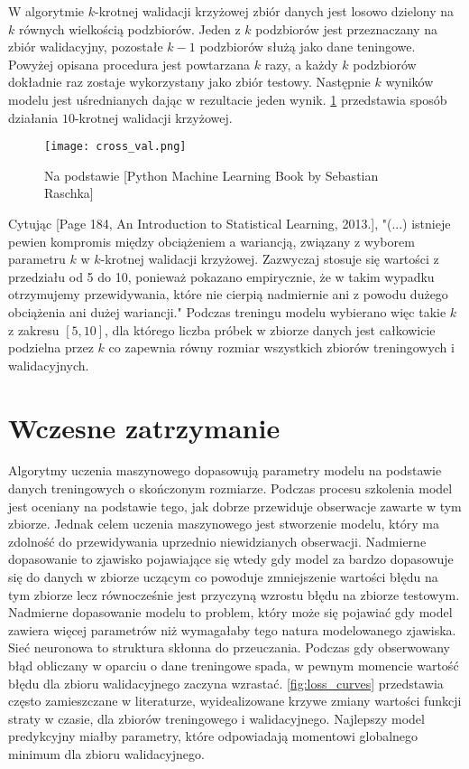 \documentclass[11pt]{book}
\theoremstyle{definition}
\begin{document}
W algorytmie $k$-krotnej walidacji krzyżowej zbiór danych jest losowo dzielony na $k$ równych wielkością podzbiorów. Jeden z $k$ podzbiorów jest przeznaczany na zbiór walidacyjny, pozostałe $k-1$ podzbiorów służą jako dane teningowe. Powyżej opisana procedura jest powtarzana $k$ razy, a każdy $k$ podzbiorów dokładnie raz zostaje wykorzystany jako zbiór testowy. Następnie $k$ wyników modelu jest uśrednianych dając w rezultacie jeden wynik. \figurename{} \ref{fig:cross-val} przedstawia sposób działania $10$-krotnej walidacji krzyżowej.

\begin{figure}[htp!]
	\centering
	\texttt{[image: cross\_val.png]}
	\caption{Na podstawie [Python Machine Learning
		Book by Sebastian Raschka]}
	\label{fig:cross-val}
\end{figure}

Cytując [Page 184, An Introduction to Statistical Learning, 2013.], "(...) istnieje pewien kompromis między obciążeniem a wariancją, związany z wyborem parametru $k$ w $k$-krotnej walidacji krzyżowej. Zazwyczaj stosuje się wartości z przedziału od 5 do 10, ponieważ pokazano empirycznie, że w takim wypadku otrzymujemy przewidywania, które nie cierpią nadmiernie ani z powodu dużego obciążenia ani dużej wariancji." Podczas treningu modelu wybierano więc takie $k$ z zakresu $[5,10]$, dla którego liczba próbek w zbiorze danych jest całkowicie podzielna przez $k$ co zapewnia równy rozmiar wszystkich zbiorów treningowych i walidacyjnych.

\section{Wczesne zatrzymanie}
Algorytmy uczenia maszynowego dopasowują parametry modelu na podstawie danych treningowych o skończonym rozmiarze. Podczas procesu szkolenia model jest oceniany na podstawie tego, jak dobrze przewiduje obserwacje zawarte w tym zbiorze. Jednak celem uczenia maszynowego jest stworzenie modelu, który ma zdolność do przewidywania uprzednio niewidzianych obserwacji. Nadmierne dopasowanie to zjawisko pojawiające się wtedy gdy model za bardzo dopasowuje się do danych w zbiorze uczącym co powoduje zmniejszenie wartości błędu na tym zbiorze lecz równocześnie jest przyczyną wzrostu błędu na zbiorze testowym. Nadmierne dopasowanie modelu to problem, który może się pojawiać gdy model zawiera więcej parametrów niż wymagałaby tego natura modelowanego zjawiska. Sieć neuronowa to struktura skłonna do przeuczania. Podczas gdy obserwowany błąd obliczany w oparciu o dane treningowe spada, w pewnym momencie wartość błędu dla zbioru walidacyjnego zaczyna wzrastać. \figurename{} \ref{fig:loss_curves} przedstawia często zamieszczane w literaturze, wyidealizowane krzywe zmiany wartości funkcji straty w czasie, dla zbiorów treningowego i walidacyjnego. Najlepszy model predykcyjny miałby parametry, które odpowiadają momentowi globalnego minimum dla zbioru walidacyjnego.
\end{document}
